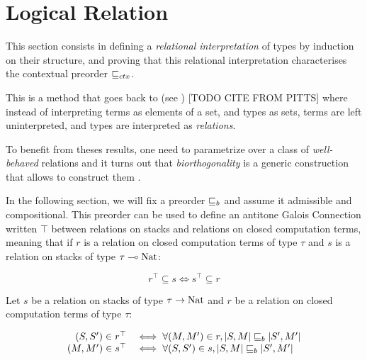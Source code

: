 \section{Logical Relation}

This section consists in defining a \emph{relational interpretation}
of types by induction on their structure, and proving that 
this relational interpretation characterises the contextual 
preorder $\sqsubseteq_{ctx}$. 

This is a method that goes back to \cite{Reynolds83} 
(see \cite{wadler1989theorems}) [TODO CITE FROM PITTS] where 
instead of interpreting terms as elements of 
a set, and types as sets, terms are left 
uninterpreted, and types are interpreted as \emph{relations}.

To benefit from theses results, one need to parametrize 
over a class of \emph{well-behaved} relations \cite{Pitts2000} 
and it turns out that \emph{biorthogonality} 
is a generic construction that allows to construct them 
\cite{mellies2005recursive}.

\vspace{1em}

In the following section, we will fix a preorder $\sqsubseteq_b$
and assume it admissible and compositional. This 
preorder can be used to define an antitone Galois Connection 
written $\top$ between relations on stacks and relations on closed 
computation terms, meaning 
that if $r$ is a relation on closed computation terms of type $\tau$ and $s$ is 
a relation on stacks of type $\tau \multimap \textnormal{Nat}$:

\begin{equation*}
    r^\top \subseteq s \iff s^\top \subseteq r
\end{equation*}

\begin{adefinition}
    Let $s$ be a relation on stacks of type $\tau \to \textnormal{Nat}$ 
    and $r$ be a relation on closed computation terms 
    of type $\tau$:

    \begin{equation*}
        \begin{array}{rl}
            (S,S') \in r^\top &\iff
            \forall (M,M') \in r, |S,M| \sqsubseteq_b |S',M'|\\ 
            (M,M') \in s^\top &\iff
            \forall (S,S') \in s, |S,M| \sqsubseteq_b |S',M'|
        \end{array}
    \end{equation*}
\end{adefinition}

